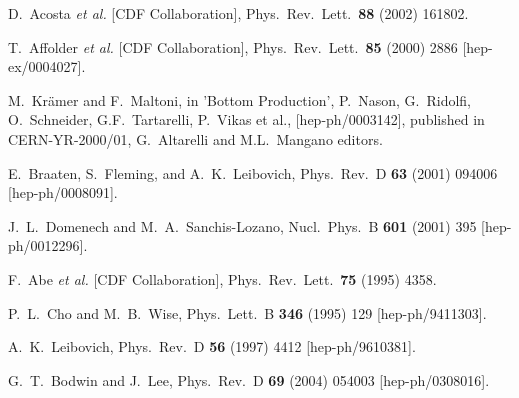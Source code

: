 \begin{thebibliography}{999}

D.~Acosta {\it et al.}  [CDF Collaboration],
Phys.\ Rev.\ Lett.\  {\bf 88} (2002) 161802.

T.~Affolder {\it et al.}  [CDF Collaboration],
Phys.\ Rev.\ Lett.\  {\bf 85} (2000) 2886
[hep-ex/0004027].

M.~Kr\"amer and F.~Maltoni,
in 'Bottom Production',
P.~Nason, G.~Ridolfi, O.~Schneider, G.F.~Tartarelli, P.~Vikas et al.,
[hep-ph/0003142], published in CERN-YR-2000/01, G.~Altarelli and
M.L.~Mangano editors.

E.~Braaten, S.~Fleming, and A.~K.~Leibovich,
Phys.\ Rev.\ D {\bf 63} (2001) 094006
[hep-ph/0008091].

J.~L.~Domenech and M.~A.~Sanchis-Lozano,
Nucl.\ Phys.\ B {\bf 601} (2001) 395
[hep-ph/0012296].

F.~Abe {\it et al.}  [CDF Collaboration],
Phys.\ Rev.\ Lett.\  {\bf 75} (1995) 4358.


P.~L.~Cho and M.~B.~Wise,
Phys.\ Lett.\ B {\bf 346} (1995) 129
[hep-ph/9411303].

A.~K.~Leibovich,
Phys.\ Rev.\ D {\bf 56} (1997) 4412
[hep-ph/9610381].

G.~T.~Bodwin and J.~Lee,
Phys.\ Rev.\ D {\bf 69} (2004) 054003 
[hep-ph/0308016].


\end{thebibliography}
